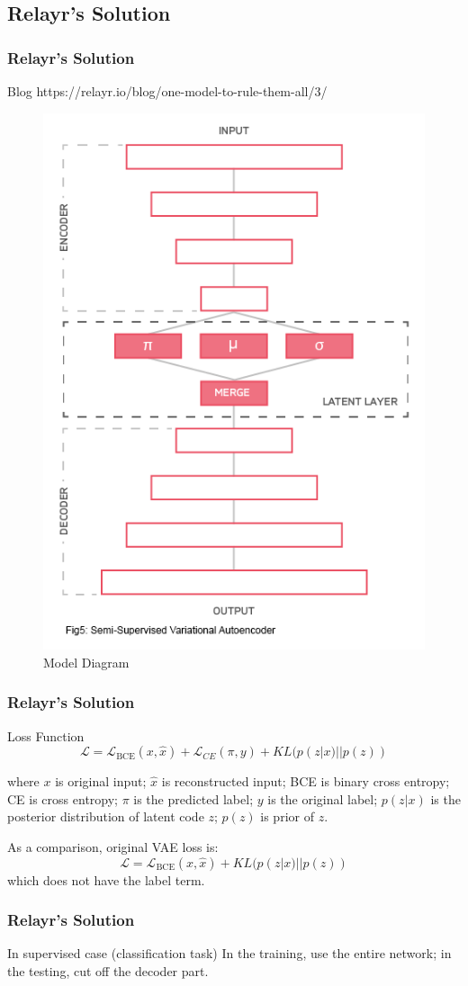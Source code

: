 \documentclass{beamer}
\begin{document}
\begin{frame}
\begin{frame}
\begin{frame}
\begin{frame}
\subsection{Relayr's Solution}
\begin{frame}
\frametitle{Relayr's Solution}
\begin{block}{Blog}
https://relayr.io/blog/one-model-to-rule-them-all/3/
\end{block}
\begin{figure}
\includegraphics[width=0.4\linewidth]{figs/relayr_diagram.png}
\caption{Model Diagram}
\end{figure}
\end{frame}

\begin{frame}
\frametitle{Relayr's Solution}
\begin{block}{Loss Function}
\[
\mathcal{L} = \mathcal{L}_{\text{BCE}}(x, \hat{x}) + \mathcal{L}_{CE}(\pi, y) + KL(p(z|x)||p(z))
\]
\end{block}
where $x$ is original input; 
$\hat{x}$ is reconstructed input; 
BCE is binary cross entropy; 
CE is cross entropy;
$\pi$ is the predicted label;
$y$ is the original label;
$p(z|x)$ is the posterior distribution of latent code $z$;
$p(z)$ is prior of $z$.

As a comparison, original VAE loss is:
\[
\mathcal{L} = \mathcal{L}_{\text{BCE}}(x, \hat{x}) + KL(p(z|x)||p(z))
\]
which does not have the label term.

\end{frame}

\begin{frame}
\frametitle{Relayr's Solution}

\begin{block}{In supervised case (classification task)}
In the training, use the entire network; in the testing, cut off the decoder part.
\end{block}


\end{frame}
\end{frame}
\end{frame}
\end{frame}
\end{frame}
\end{document}
